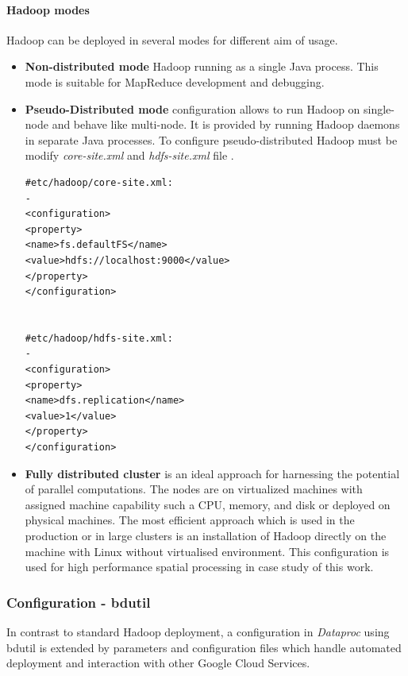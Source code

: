 \documentclass[a4paper,12pt,oneside]{report}
\begin{document}
	\paragraph{Hadoop modes} Hadoop can be deployed in several modes for different aim of usage. 
		\begin{itemize}
	    \item \textbf{Non-distributed mode} Hadoop running  as a single Java process. This mode  is suitable for MapReduce development and debugging.
	 	
		\item \textbf{Pseudo-Distributed mode}  configuration allows to run  Hadoop on
		single-node and behave
		like multi-node. It is provided by running Hadoop daemons in separate Java
		processes. To configure pseudo-distributed Hadoop must be modify
		\textit{core-site.xml} and \textit{hdfs-site.xml} file \cite{hadoop_definitive}.  
		
		
		\begin{footnotesize}
			\begin{lstlisting}[style=python]
#etc/hadoop/core-site.xml:
-
<configuration>
<property>
<name>fs.defaultFS</name>
<value>hdfs://localhost:9000</value>
</property>
</configuration>


#etc/hadoop/hdfs-site.xml: 
-
<configuration>
<property>
<name>dfs.replication</name>
<value>1</value>
</property>
</configuration>
			\end{lstlisting}
		\end{footnotesize}
		
		\item \textbf{Fully distributed cluster} is an ideal approach for harnessing the
		potential of	parallel computations. The nodes are on virtualized machines with 
		assigned machine capability such a CPU, memory, and disk or deployed on physical machines. 
		The most efficient approach which is used in the production or in large clusters is an installation of Hadoop directly on the machine with Linux without virtualised environment. 
		This configuration is used for high performance spatial processing in case study of this work.
		
	\end{itemize}
	
	
	\subsubsection{Configuration - bdutil}
	In contrast to standard Hadoop deployment, a configuration in \textit{Dataproc}
	using bdutil is  extended by parameters and configuration files which handle automated deployment
	and interaction with other Google Cloud Services. 
\end{document}
